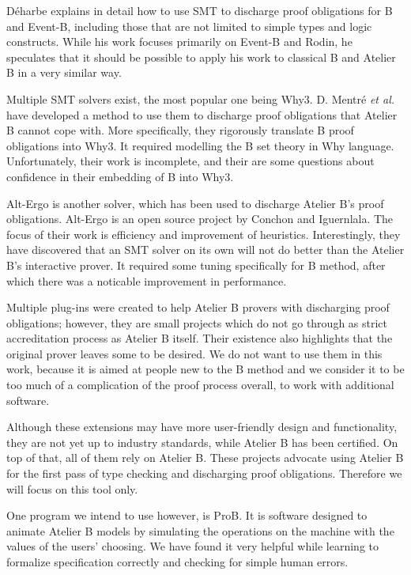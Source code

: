 \documentclass[12pt,journal,duplex]{IEEEtran}
\begin{document}
	D\'{e}harbe explains in detail how to use SMT to discharge proof obligations for B and Event-B, including those that are not limited to simple types and logic constructs. While his work focuses primarily on Event-B and Rodin, he speculates that it should be possible to apply his work to classical B and Atelier B in a very similar way.\cite{SMT} 
	
	Multiple SMT solvers exist, the most popular one being Why3. D. Mentr\'{e} \emph{et al.} have developed a method to use them to discharge proof obligations that Atelier B cannot cope with. More specifically, they rigorously translate B proof obligations into Why3. It required modelling the B set theory in Why language. Unfortunately, their work is incomplete, and their are some questions about confidence in their embedding of B into Why3.\cite{discharging}
	
	Alt-Ergo is another solver, which has been used to discharge Atelier B's proof obligations.\cite{Alt-Ergo} Alt-Ergo is an open source project by Conchon and Iguernlala. The focus of their work is efficiency and improvement of heuristics. Interestingly, they have discovered that an SMT solver on its own will not do better than the Atelier B's interactive prover. It required some tuning specifically for B method, after which there was a noticable improvement in performance.
	
	Multiple plug-ins were created to help Atelier B provers with discharging proof obligations; however, they are small projects which do not go through as strict accreditation process as Atelier B itself. Their existence also highlights that the original prover leaves some to be desired. We do not want to use them in this work, because it is aimed at people new to the B method and we consider it to be too much of a complication of the proof process overall, to work with additional software.\cite{BEval}\cite{BWare}
	
	Although these extensions may have more user-friendly design and functionality, they are not yet up to industry standards, while Atelier B has been certified. On top of that, all of them rely on Atelier B. These projects advocate using Atelier B for the first pass of type checking and discharging proof obligations. Therefore we will focus on this tool only.
	
	One program we intend to use however, is ProB. It is software designed to animate Atelier B models by simulating the operations on the machine with the values of the users' choosing. We have found it very helpful while learning to formalize specification correctly and checking for simple human errors.\cite{proB}
	
\end{document}

